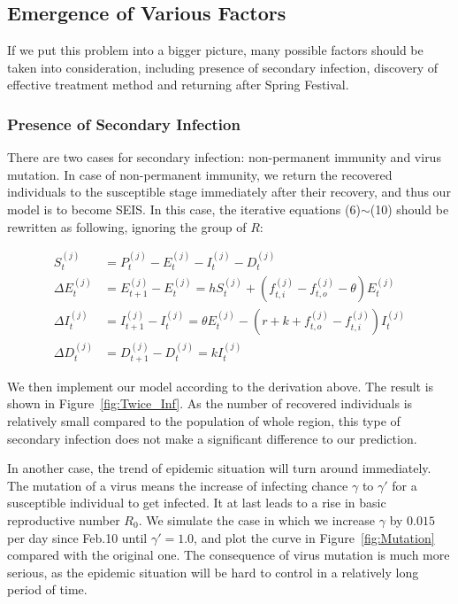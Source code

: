 \documentclass[12pt]{mcmthesis}
\begin{document}
\subsection{Emergence of Various Factors}
If we put this problem into a bigger picture, many possible factors should be taken into consideration, including presence of secondary infection, discovery of effective treatment method and returning after Spring Festival.

\subsubsection{Presence of Secondary Infection}
There are two cases for secondary infection: non-permanent immunity and virus mutation. In case of non-permanent immunity, we return the recovered individuals to the susceptible stage immediately after their recovery, and thus our model is to become SEIS. In this case, the iterative equations (6)$\sim$(10) should be rewritten as following, ignoring the group of $R$:

\begin{align*}
    S_t^{(j)} &= P_t^{(j)} - E_t^{(j)} - I_t^{(j)} - D_t^{(j)} \\
    \Delta E_t^{(j)} &= E_{t+1}^{(j)} - E_t^{(j)} = hS_t^{(j)} + \left(f_{t,i}^{(j)} - f_{t,o}^{(j)} - \theta\right)E_t^{(j)} \\
    \Delta I_t^{(j)} &= I_{t+1}^{(j)} - I_t^{(j)} = \theta E_t^{(j)} - \left(r + k + f_{t,o}^{(j)} - f_{t,i}^{(j)}\right)I_t^{(j)} \\
    \Delta D_t^{(j)} &= D_{t+1}^{(j)} - D_t^{(j)} = kI_t^{(j)}
\end{align*}

We then implement our model according to the derivation above. The result is shown in Figure~\ref{fig:Twice_Inf}. As the number of recovered individuals is relatively small compared to the population of whole region, this type of secondary infection does not make a significant difference to our prediction.

In another case, the trend of epidemic situation will turn around immediately. The mutation of a virus means the increase of infecting chance $\gamma$ to $\gamma'$ for a susceptible individual to get infected. It at last leads to a rise in basic reproductive number $R_0$. We simulate the case in which we increase $\gamma$ by $0.015$ per day since Feb.10 until $\gamma'=1.0$, and plot the curve in Figure~\ref{fig:Mutation} compared with the original one. The consequence of virus mutation is much more serious, as the epidemic situation will be hard to control in a relatively long period of time.
\end{document}
